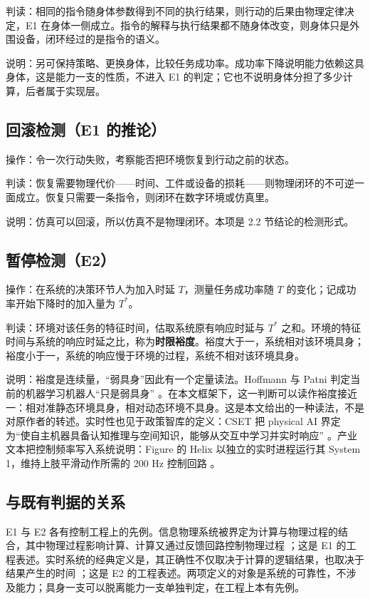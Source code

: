 \documentclass[10pt,fontset=fandol]{ctexart}
\begin{document}
判读：相同的指令随身体参数得到不同的执行结果，则行动的后果由物理定律决定，E1 在身体一侧成立。指令的解释与执行结果都不随身体改变，则身体只是外围设备，闭环经过的是指令的语义。

说明：另可保持策略、更换身体，比较任务成功率。成功率下降说明能力依赖这具身体，这是能力一支的性质，不进入 E1 的判定；它也不说明身体分担了多少计算，后者属于实现层。

\subsection{回滚检测（E1 的推论）}

操作：令一次行动失败，考察能否把环境恢复到行动之前的状态。

判读：恢复需要物理代价——时间、工件或设备的损耗——则物理闭环的不可逆一面成立。恢复只需要一条指令，则闭环在数字环境或仿真里。

说明：仿真可以回滚，所以仿真不是物理闭环。本项是 2.2 节结论的检测形式。

\subsection{暂停检测（E2）}

操作：在系统的决策环节人为加入时延 $T$，测量任务成功率随 $T$ 的变化；记成功率开始下降时的加入量为 $T^{*}$。

判读：环境对该任务的特征时间，估取系统原有响应时延与 $T^{*}$ 之和。环境的特征时间与系统的响应时延之比，称为\textbf{时限裕度}。裕度大于一，系统相对该环境具身；裕度小于一，系统的响应慢于环境的过程，系统不相对该环境具身。

说明：裕度是连续量，“弱具身”因此有一个定量读法。Hoffmann 与 Patni 判定当前的机器学习机器人“只是弱具身” \cite{hoffmann2025}。在本文框架下，这一判断可以读作裕度接近一：相对准静态环境具身，相对动态环境不具身。这是本文给出的一种读法，不是对原作者的转述。实时性也见于政策智库的定义：CSET 把 physical AI 界定为“使自主机器具备认知推理与空间知识，能够从交互中学习并实时响应” \cite{cset2026}。产业文本把控制频率写入系统说明：Figure 的 Helix 以独立的实时进程运行其 System 1，维持上肢平滑动作所需的 200 Hz 控制回路 \cite{figure_helix}。

\subsection{与既有判据的关系}

E1 与 E2 各有控制工程上的先例。信息物理系统被界定为计算与物理过程的结合，其中物理过程影响计算、计算又通过反馈回路控制物理过程 \cite{lee2008}；这是 E1 的工程表述。实时系统的经典定义是，其正确性不仅取决于计算的逻辑结果，也取决于结果产生的时间 \cite{stankovic1988}；这是 E2 的工程表述。两项定义的对象是系统的可靠性，不涉及能力；具身一支可以脱离能力一支单独判定，在工程上本有先例。
\end{document}
